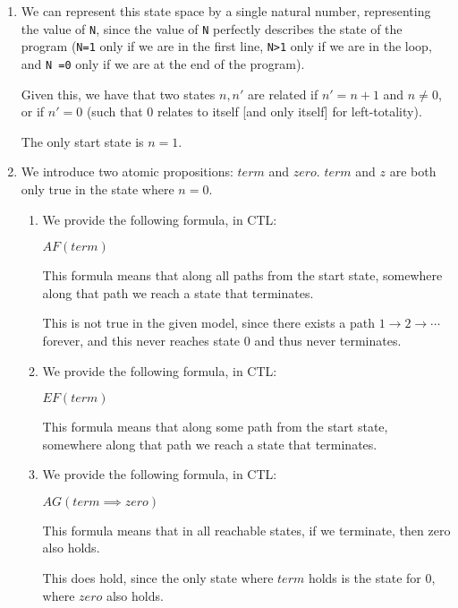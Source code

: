 


\begin{enumerate}[label=(\alph*)]

  \item
    We can represent this state space by a single natural number, representing the value of \texttt{N}, since the value of \texttt{N} perfectly describes the state of the program (\texttt{N=1} only if we are in the first line, \texttt{N>1} only if we are in the loop, and \texttt{N =0} only if we are at the end of the program).

    Given this, we have that two states $n,n'$ are related if $n' = n+1$ and $n \neq 0$, or if $n' = 0$ (such that 0 relates to itself [and only itself] for left-totality).

    The only start state is $n=1$.
    
    \item

      We introduce two atomic propositions: $term$ and $zero$. $term$ and $z$ are both only true in the state where $n=0$.

      \begin{enumerate}[label=(\roman*)]

        \item
          We provide the following formula, in CTL:

          $A F(term)$

          This formula means that along all paths from the start state, somewhere along that path we reach a state that terminates.

          This is not true in the given model, since there exists a path $1 \rightarrow 2 \rightarrow \cdots$ forever, and this never reaches state 0 and thus never terminates.

          \item
            We provide the following formula, in CTL:

            $E F(term)$

            This formula means that along some path from the start state, somewhere along that path we reach a state that terminates.

            \item
              We provide the following formula, in CTL:

              $AG (term \implies zero)$

              This formula means that in all reachable states, if we terminate, then zero also holds.

              This does hold, since the only state where $term$ holds is the state for 0, where $zero$ also holds.
          
      \end{enumerate}


        
    \end{enumerate}

